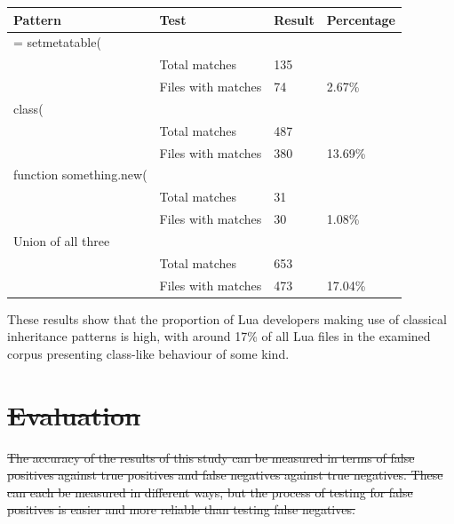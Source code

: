 \documentclass[11pt
              , a4paper
              , twoside
              , openright
              ]{report}
\providecommand{\DIFdel}[1]{{\protect\color{red}\sout{#1}}}                      %
\providecommand{\DIFdelbegin}{} %
\begin{document}
\begin{center}
	\label{LuaResults}
	\begin{tabular}{|l|l|l|l|}
		\hline
		Pattern                 & Test               & Result & Percentage \\ \hline
		= setmetatable(        &                    &        &            \\ \hline
		& Total matches      & 135    &            \\ \hline
		& Files with matches & 74     & 2.67\%     \\ \hline
		class(                  &                    &        &            \\ \hline
		& Total matches      & 487    &            \\ \hline
		& Files with matches & 380    & 13.69\%    \\ \hline
		function something.new( &                    &        &            \\ \hline
		& Total matches      & 31     &            \\ \hline
		& Files with matches & 30     & 1.08\%     \\ \hline
		Union of all three      &                    &        &            \\ \hline
		& Total matches      & 653    &            \\ \hline
		& Files with matches & 473    & 17.04\%    \\ \hline
	\end{tabular}
	\newline
	\newline
\end{center}

These results show that the proportion of Lua developers making use of classical inheritance patterns is high, with around 17\% of all Lua files in the examined corpus presenting class-like behaviour of some kind.












\DIFdelbegin \section{\DIFdel{Evaluation}}
\addtocounter{section}{-1}%
\DIFdel{The accuracy of the results of this study can be measured in terms of false positives against true positives and false negatives against true negatives. These can each be measured in different ways, but the process of testing for false positives is easier and more reliable than testing false negatives.
}%
\end{document}
